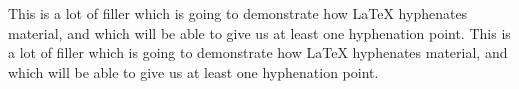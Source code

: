 \documentclass{article}
\begin{document}
	This is a lot of filler which is going to demonstrate how LaTeX hyphenates
	material, and which will be able to give us at least one hyphenation point.
	This is a lot of filler which is going to demonstrate how LaTeX hyphenates
	material, and which will be able to give us at least one hyphenation point.
\end{document}
